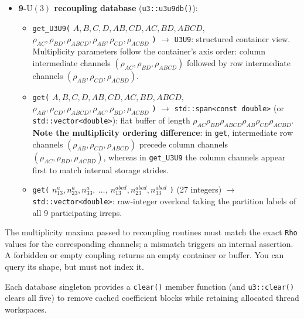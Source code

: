 \documentclass[aps,onecolumn,10pt,superscriptaddress,floatfix,nofootinbib]{revtex4}
\begin{document}
\begin{itemize}
    \item \textbf{9-$\mathrm{U(3)}$ recoupling database} (\verb|u3::u3u9db()|):
    \begin{itemize}
        \item \verb|get_U3U9(| $A,B,C,D,AB,CD,AC,BD,ABCD,$ $\rho_{AC},\rho_{BD},\rho_{ABCD},\rho_{AB},\rho_{CD},\rho_{ACBD}$ \verb|)| $\to$ \verb|U3U9|: structured container view. Multiplicity parameters follow the container's axis order: column intermediate channels $(\rho_{AC},\rho_{BD},\rho_{ABCD})$ followed by row intermediate channels $(\rho_{AB},\rho_{CD},\rho_{ACBD})$.
        \item \verb|get(| $A,B,C,D,AB,CD,AC,BD,ABCD,$ $\rho_{AB},\rho_{CD},\rho_{ABCD},\rho_{AC},\rho_{BD},\rho_{ACBD}$ \verb|)| $\to$ \verb|std::span<const double>| (or \verb|std::vector<double>|): flat buffer of length $\rho_{AC}\rho_{BD}\rho_{ABCD}\rho_{AB}\rho_{CD}\rho_{ACBD}$. \textbf{Note the multiplicity ordering difference}: in \verb|get|, intermediate row channels $(\rho_{AB},\rho_{CD},\rho_{ABCD})$ precede column channels $(\rho_{AC},\rho_{BD},\rho_{ACBD})$, whereas in \verb|get_U3U9| the column channels appear first to match internal storage strides.
        \item \verb|get(| $n_{13}^a,n_{23}^a,n_{33}^a,\ \dots,\ n_{13}^{abcd},n_{23}^{abcd},n_{33}^{abcd}$ \verb|)| (27 integers) $\to$ \verb|std::vector<double>|: raw-integer overload taking the partition labels of all 9 participating irreps.
    \end{itemize}
\end{itemize}

The multiplicity maxima passed to recoupling routines must match the exact \verb|Rho| values for the corresponding channels; a mismatch triggers an internal assertion. A forbidden or empty coupling returns an empty container or buffer. You can query its shape, but must not index it.

Each database singleton provides a \verb|clear()| member function (and \verb|u3::clear()| clears all five) to remove cached coefficient blocks while retaining allocated thread workspaces.
\end{document}
